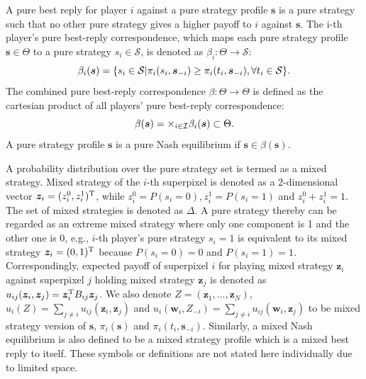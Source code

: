 \documentclass[journal]{IEEEtran}
\begin{document}
A pure best reply for player $i$ against a pure strategy profile $\boldsymbol{s}$ is a pure strategy such that no other pure strategy gives a higher payoff to $i$ against $\boldsymbol{s}$. The i-th player's pure best-reply correspondence, which maps each pure strategy profile $ \boldsymbol{s} \in \Theta$ to a pure strategy $s_i \in \mathcal{S}$, is denoted as $\beta_i: \Theta \rightarrow \mathcal{S}$: 
\begin{equation}
\setlength{\abovedisplayskip}{2pt}
\setlength{\belowdisplayskip}{2pt}
\beta_i(\boldsymbol{s}) = \{ s_i \in \mathcal{S} | \pi_i(s_i, \boldsymbol{s}_{-i}) \ge \pi_i(t_i, \boldsymbol{s}_{-i}), \forall t_i \in \mathcal{S} \}. 
\end{equation}
The combined pure best-reply correspondence $\beta: \Theta \rightarrow \Theta$ is defined as the cartesian product of all players' pure best-reply correspondence:
\begin{equation}
\setlength{\abovedisplayskip}{2pt}
\setlength{\belowdisplayskip}{2pt}
\label{equilibria}
\beta(\boldsymbol{s}) = \times_{i\in\mathcal{I}} \beta_i(\boldsymbol{s}) \subset \Theta. 
\end{equation}
A pure strategy profile $\boldsymbol{s}$ is a pure Nash equilibrium if $\boldsymbol{s} \in \beta(\boldsymbol{s})$.

A probability distribution over the pure strategy set is termed as a mixed strategy. Mixed strategy of the $i$-th superpixel is denoted as a 2-dimensional vector $\boldsymbol{z}_i = (z_{i}^0, z_{i}^1)^{\rm T}$, while $z_{i}^0 = P(s_i=0), z_{i}^1 = P(s_i = 1)$ and $z_{i}^0 + z_{i}^1 = 1$. The set of mixed strategies is denoted as $\Delta$. A pure strategy thereby can be regarded as an extreme mixed strategy where only one component is 1 and the other one is 0, e.g., $i$-th player's pure strategy $s_i = 1$ is equivalent to its mixed strategy $\boldsymbol{z}_i = (0, 1)^{\rm T}$ because $P(s_i=0)=0$ and $P(s_i=1)=1$. Correspondingly, expected payoff of superpixel $i$ for playing mixed strategy $\boldsymbol{z}_i$ against superpixel $j$ holding mixed strategy $\boldsymbol{z}_j$ is denoted as $u_{ij}(\boldsymbol{z}_i, \boldsymbol{z}_j) = \boldsymbol{z}_i^{\rm T} B_{ij} \boldsymbol{z}_j$. We also denote $Z = (\boldsymbol{z}_1, ..., \boldsymbol{z}_N)$, $u_i(Z) = \sum_{j \neq i} u_{ij}(\boldsymbol{z}_i, \boldsymbol{z}_j)$ and $u_i(\boldsymbol{w}_i, Z_{-i}) = \sum_{j \neq i} u_{ij}(\boldsymbol{w}_i, \boldsymbol{z}_j)$ to be mixed strategy version of $\boldsymbol{s}$, $\pi_{i}(\boldsymbol{s})$ and $\pi_{i}(t_i, \boldsymbol{s}_{-i})$. Similarly, a mixed Nash equilibrium is also defined to be a mixed strategy profile which is a mixed best reply to itself. These symbols or definitions are not stated here individually due to limited space. 
\end{document}

